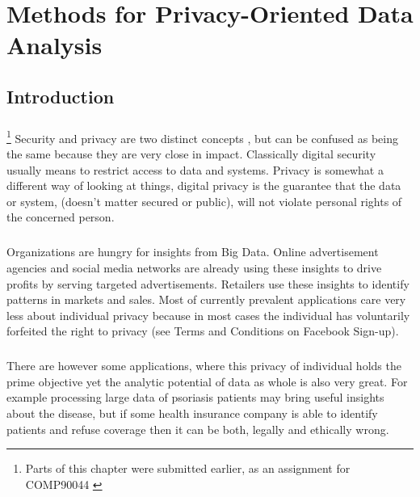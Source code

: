 \documentclass[12pt]{report}
\theoremstyle{named}
\begin{document}
\chapter{Methods for Privacy-Oriented Data Analysis}
\label{chap:PrivacyDataTechniques}
\section{Introduction}
\paragraph{}
\footnote{Parts of this chapter were submitted earlier, as an assignment for COMP90044 \cite{ReserachMethodsLitReview}} Security and privacy are two distinct concepts \cite{spencer2001security}, but can be confused as being the same because they are very close in impact. Classically digital security usually means to restrict access to data and systems. Privacy is somewhat a different way of looking at things, digital privacy is the guarantee that the data or system, (doesn't matter secured or public), will not violate personal rights of the concerned person.

\paragraph{}
Organizations are hungry for insights from Big Data. Online advertisement agencies and social media networks are already using these insights to drive profits by serving targeted advertisements. Retailers use these insights to identify patterns in markets and sales. Most of currently prevalent applications care very less about individual privacy because in most cases the individual has voluntarily forfeited the right to privacy (see Terms and Conditions on Facebook Sign-up).
\paragraph{}
There are however some applications, where this privacy of individual holds the prime objective yet the analytic potential of data as whole is also very great. For example processing large data of psoriasis patients may bring useful insights about the disease, but if some health insurance company is able to identify patients and refuse coverage then it can be both, legally and ethically wrong. 
\end{document}
